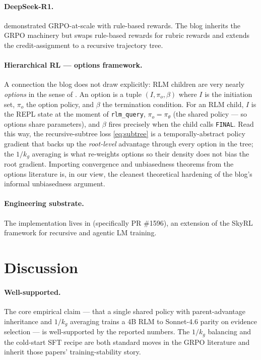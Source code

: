 \documentclass[11pt]{article}
\begin{document}
\paragraph{DeepSeek-R1.}
\citet{deepseek2025r1} demonstrated GRPO-at-scale with rule-based rewards.
The blog inherits the GRPO machinery but swaps rule-based rewards for rubric
rewards and extends the credit-assignment to a recursive trajectory tree.

\paragraph{Hierarchical RL --- options framework.}
A connection the blog does not draw explicitly: RLM children are very nearly
\emph{options} in the sense of \citet{sutton1999options}. An option is a tuple
$(I, \pi_o, \beta)$ where $I$ is the initiation set, $\pi_o$ the option policy,
and $\beta$ the termination condition. For an RLM child, $I$ is the REPL state
at the moment of \texttt{rlm\_query}, $\pi_o = \pi_\theta$ (the shared
policy --- so options share parameters), and $\beta$ fires precisely when the
child calls \texttt{FINAL}. Read this way, the recursive-subtree loss
\eqref{eq:subtree} is a temporally-abstract policy gradient that backs up the
\emph{root-level} advantage through every option in the tree; the $1/k_g$
averaging is what re-weights options so their density does not bias the root
gradient. Importing convergence and unbiasedness theorems from the options
literature is, in our view, the cleanest theoretical hardening of the blog's
informal unbiasedness argument.

\paragraph{Engineering substrate.}
The implementation lives in \citet{skyrl2025} (specifically PR \#1596), an
extension of the SkyRL framework for recursive and agentic LM training.

\section*{Discussion}

\paragraph{Well-supported.}
The core empirical claim --- that a single shared policy with parent-advantage
inheritance and $1/k_g$ averaging trains a 4B RLM to Sonnet-4.6 parity on
evidence selection --- is well-supported by the reported numbers. The
$1/k_g$ balancing and the cold-start SFT recipe are both standard moves in the
GRPO literature \citep{shao2024deepseekmath, deepseek2025r1, rajani2025grpo}
and inherit those papers' training-stability story.
\end{document}
